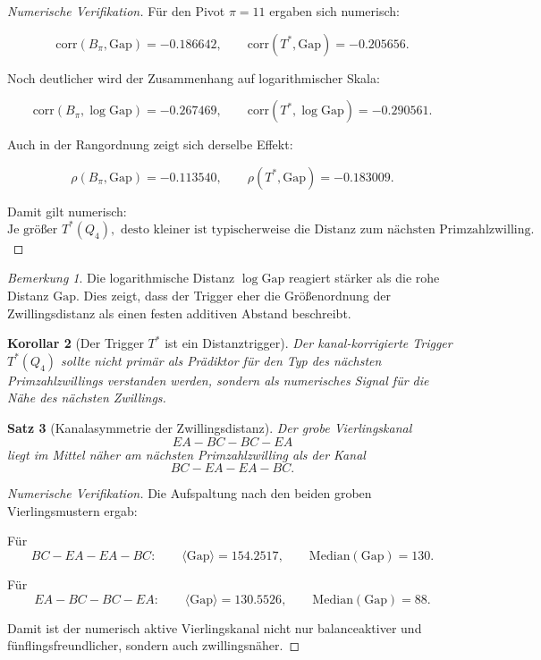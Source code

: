 \documentclass[11pt,a4paper]{article}
\newtheorem{satz}{Satz}
\newtheorem{korollar}[satz]{Korollar}
\theoremstyle{definition}
\theoremstyle{remark}
\newtheorem{bemerkung}[satz]{Bemerkung}
\begin{document}
	\begin{proof}[Numerische Verifikation]
		Für den Pivot \(\pi=11\) ergaben sich numerisch:
		
		\[
		\mathrm{corr}(B_\pi,\mathrm{Gap})=-0.186642,
		\qquad
		\mathrm{corr}(T^*,\mathrm{Gap})=-0.205656.
		\]
		
		Noch deutlicher wird der Zusammenhang auf logarithmischer Skala:
		
		\[
		\mathrm{corr}(B_\pi,\log \mathrm{Gap})=-0.267469,
		\qquad
		\mathrm{corr}(T^*,\log \mathrm{Gap})=-0.290561.
		\]
		
		Auch in der Rangordnung zeigt sich derselbe Effekt:
		
		\[
		\rho(B_\pi,\mathrm{Gap})=-0.113540,
		\qquad
		\rho(T^*,\mathrm{Gap})=-0.183009.
		\]
		
		Damit gilt numerisch:
		\[
		\boxed{
			\text{Je größer }T^*(Q_4),\text{ desto kleiner ist typischerweise die Distanz zum nächsten Primzahlzwilling.}
		}
		\]
	\end{proof}
	
	\begin{bemerkung}
		Die logarithmische Distanz \(\log \mathrm{Gap}\) reagiert stärker als die rohe Distanz
		\(\mathrm{Gap}\). Dies zeigt, dass der Trigger eher die Größenordnung der Zwillingsdistanz
		als einen festen additiven Abstand beschreibt.
	\end{bemerkung}
	
	\begin{korollar}[Der Trigger \(T^*\) ist ein Distanztrigger]
		\label{kor:distanztrigger}
		Der kanal-korrigierte Trigger \(T^*(Q_4)\) sollte nicht primär als Prädiktor für den Typ des
		nächsten Primzahlzwillings verstanden werden, sondern als numerisches Signal für die
		\emph{Nähe} des nächsten Zwillings.
	\end{korollar}
	
	\begin{satz}[Kanalasymmetrie der Zwillingsdistanz]
		\label{satz:kanalasymmetrie_zwillingsdistanz}
		Der grobe Vierlingskanal
		\[
		EA-BC-BC-EA
		\]
		liegt im Mittel näher am nächsten Primzahlzwilling als der Kanal
		\[
		BC-EA-EA-BC.
		\]
	\end{satz}
	
	\begin{proof}[Numerische Verifikation]
		Die Aufspaltung nach den beiden groben Vierlingsmustern ergab:
		
		Für
		\[
		BC-EA-EA-BC:
		\qquad
		\langle \mathrm{Gap}\rangle = 154.2517,
		\qquad
		\mathrm{Median}(\mathrm{Gap}) = 130.
		\]
		
		Für
		\[
		EA-BC-BC-EA:
		\qquad
		\langle \mathrm{Gap}\rangle = 130.5526,
		\qquad
		\mathrm{Median}(\mathrm{Gap}) = 88.
		\]
		
		Damit ist der numerisch aktive Vierlingskanal nicht nur balanceaktiver und
		fünflingsfreundlicher, sondern auch zwillingsnäher.
	\end{proof}
	
\end{document}
